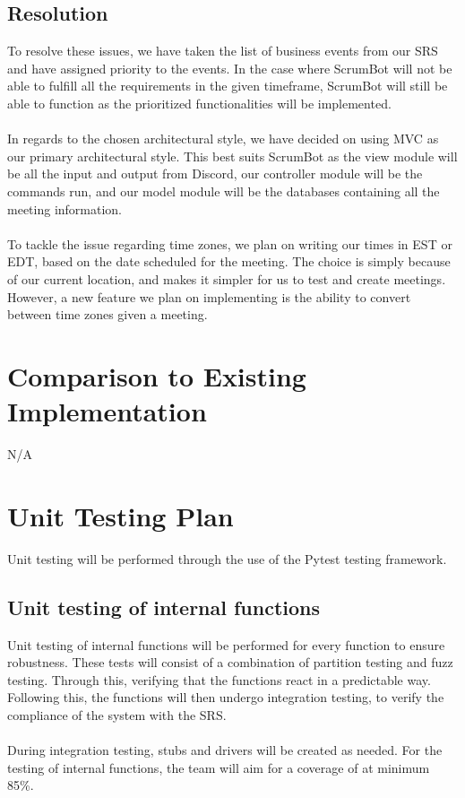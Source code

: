 \documentclass[12pt, titlepage]{article}
\begin{document}
\subsection{Resolution}
To resolve these issues, we have taken the list of business events from our SRS and have assigned priority to the events. In the case where ScrumBot will not be able to fulfill all the requirements in the given timeframe, ScrumBot will still be able to function as the prioritized functionalities will be implemented.\\ \\
\noindent In regards to the chosen architectural style, we have decided on using MVC as our primary architectural style. This best suits ScrumBot as the view module will be all the input and output from Discord, our controller module will be the commands run, and our model module will be the databases containing all the meeting information.\\\\
\noindent To tackle the issue regarding time zones, we plan on writing our times in EST or EDT, based on the date scheduled for the meeting. The choice is simply because of our current location, and makes it simpler for us to test and create meetings. However, a new feature we plan on implementing is the ability to convert between time zones given a meeting.
	
\section{Comparison to Existing Implementation}
N/A

\section{Unit Testing Plan}
Unit testing will be performed through the use of the Pytest testing framework.

\subsection{Unit testing of internal functions}
Unit testing of internal functions will be performed for every function to ensure robustness. These tests will consist of a combination of partition testing and fuzz testing. Through this, verifying that the functions react in a predictable way. Following this, the functions will then undergo integration testing, to verify the compliance of the system with the SRS. 
\\\\
\noindent During integration testing, stubs and drivers will be created as needed. For the testing of internal functions, the team will aim for a coverage of at minimum 85\%.
\end{document}
